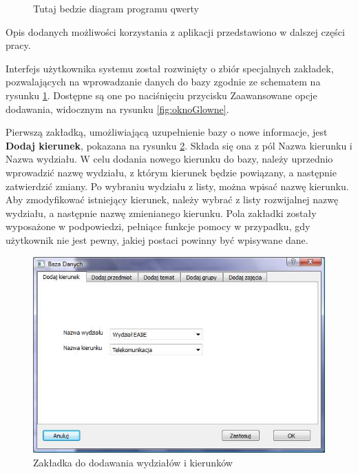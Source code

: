 \begin{figure}
\begin{center}
\caption{Tutaj bedzie diagram programu qwerty}
\label{fig:program}
\end{center}
\end{figure}

Opis dodanych możliwości korzystania z aplikacji przedstawiono w dalszej części pracy.

Interfejs użytkownika systemu został rozwinięty o zbiór specjalnych zakładek, pozwalających na wprowadzanie danych do bazy zgodnie ze schematem na rysunku \ref{fig:program}. Dostępne są one po naciśnięciu przycisku Zaawansowane opcje dodawania, widocznym na rysunku \ref{fig:oknoGlowne}. 

Pierwszą zakładką, umożliwiającą uzupełnienie bazy o nowe informacje, jest \textbf{Dodaj kierunek}, pokazana na rysunku \ref{fig:dodajSpecjalizacje}. Składa się ona z pól Nazwa kierunku i Nazwa wydziału. W celu dodania nowego kierunku do bazy, należy uprzednio wprowadzić nazwę wydziału, z którym kierunek będzie powiązany, a następnie zatwierdzić zmiany. Po wybraniu wydziału z listy, można wpisać nazwę kierunku. Aby zmodyfikować istniejący kierunek, należy wybrać z listy rozwijalnej nazwę wydziału, a następnie nazwę zmienianego kierunku. Pola zakładki zostały wyposażone w podpowiedzi, pełniące funkcje pomocy w przypadku, gdy użytkownik nie jest pewny, jakiej postaci powinny być wpisywane dane. 
\begin{figure}
\begin{center}
\includegraphics[scale=0.7]{dodaj_kierunek.jpg}
\caption{Zakładka do dodawania wydziałów i kierunków}
\label{fig:dodajSpecjalizacje}
\end{center}
\end{figure}

